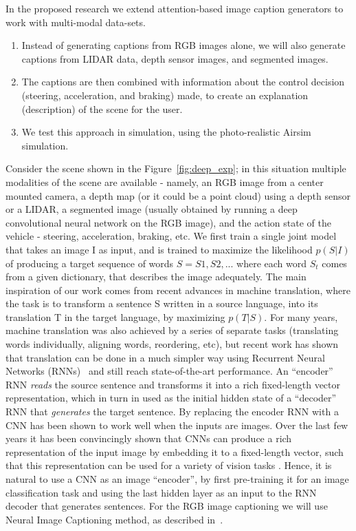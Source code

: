 In the proposed research we extend attention-based image caption generators to work with multi-modal data-sets.
\begin{enumerate}[itemsep=0pt,parsep=0pt,topsep=4pt,leftmargin=0.4in]
    \item Instead of generating captions from RGB images alone, we will also generate captions from LIDAR data, depth sensor images, and segmented images. 
    \item The captions are then combined with information about the control decision (steering, acceleration, and braking) made, to create an explanation (description) of the scene for the user. 
    \item We test this approach in simulation, using the photo-realistic Airsim~\cite{shah2018airsim} simulation. 
\end{enumerate}

Consider the scene shown in the Figure~\ref{fig:deep_exp}; in this situation multiple modalities of the scene are available - namely, an RGB image from a center mounted camera, a depth map (or it could be a point cloud) using a depth sensor or a LIDAR, a segmented image (usually obtained by running a deep convolutional neural network on the RGB image), and the action state of the vehicle - steering, acceleration, braking, etc. 
We first train a single joint model that takes an image I as input, and is trained to maximize the likelihood $p(S|I)$ of producing a target sequence of words $S = {S1, S2, . . .}$ where each word $S_t$ comes from a given dictionary, that describes the image adequately.
The main inspiration of our work comes from recent advances in machine translation, where the task is to transform a sentence S written in a source language, into its translation T in the target language, by maximizing $p(T|S)$. For many years, machine translation was also achieved by a series of separate tasks (translating words individually, aligning words, reordering, etc), but recent work has shown that translation can be done in a much simpler way using Recurrent Neural Networks (RNNs)~\cite{cho2014learning, bahdanau2014neural, sutskever2014sequence} and still reach state-of-the-art performance. An ``encoder'' RNN \textit{reads} the source sentence and transforms it into a rich fixed-length vector representation, which in turn in used as the initial hidden state of a ``decoder'' RNN that \textit{generates} the target sentence. By replacing the encoder RNN with a CNN has been shown to work well when the inputs are images. 
Over the last few years it has been convincingly shown that CNNs can produce a rich representation of the input image by embedding it to a fixed-length vector, such that this representation can be used for a variety of vision tasks \cite{sermanet2013overfeat}. 
Hence, it is natural to use a CNN as an image ``encoder'', by first pre-training it for an image classification task and using the last hidden layer as an input to the RNN decoder that generates sentences. For the RGB image captioning we will use Neural Image Captioning method, as described in~\cite{Vinyals2015ShowAT}.

